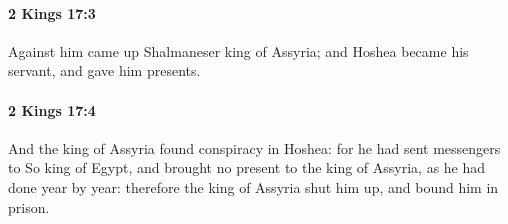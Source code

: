 		\paragraph{2 Kings 17:3} %
			\label{2KINGS-17-3}

			Against him came up Shalmaneser king of Assyria; and Hoshea became his servant, and gave him presents.


		\paragraph{2 Kings 17:4} %
			\label{2KINGS-17-4}

			And the king of Assyria found conspiracy in Hoshea: for he had sent messengers to So king of Egypt, and brought no present to the king of Assyria, as he had done year by year: therefore the king of Assyria shut him up, and bound him in prison.


